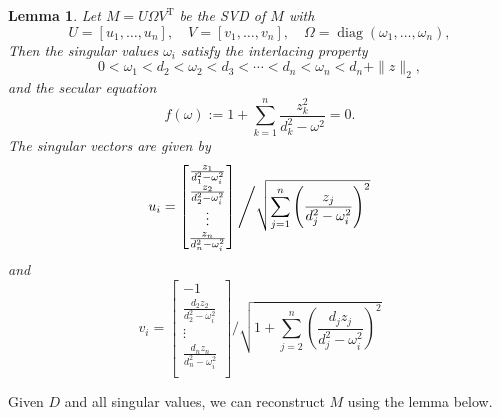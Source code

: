 \documentclass[12pt]{article}
\newcommand{\op}{\operatorname}
\newtheorem{lemma}[theorem]{Lemma}
\begin{document}
\begin{lemma} \label{lm:secular}
    Let \(M = U \Omega V^{\op T}\) be the SVD of \(M\) with
    \[
        U = [u_1, \ldots, u_n], \quad V = [v_1, \ldots, v_n], \quad \Omega = \op{diag}(\omega_1, \ldots, \omega_n),
    \]
    Then the singular values \(\omega_i\) satisfy the interlacing property
    \[
        0 < \omega_1 < d_2 < \omega_2 < d_3 < \cdots < d_n < \omega_n < d_n + \|z\|_2,
    \]
    and the secular equation
    \begin{equation} \label{eq:secular}
        f(\omega) := 1 + \sum_{k=1}^{n} \frac{z_k^2}{d_k^2 - \omega^2} = 0.
    \end{equation}
    The singular vectors are given by
    \begin{equation} \label{eq:left_sing}
        u_i = \begin{bmatrix}
            \frac{z_1}{d_1^2 - \omega_i^2} \\
            \frac{z_2}{d_2^2 - \omega_i^2} \\
            \vdots \\
            \frac{z_n}{d_n^2 - \omega_i^2} \\
        \end{bmatrix} \Bigg/ \sqrt{
            \sum_{j=1}^{n} \left( \frac{z_j}{d_j^2 - \omega_i^2} \right)^2
        } \\
    \end{equation}
    and
    \begin{equation} \label{eq:right_sing}
        v_i = \begin{bmatrix}
            -1 \\
            \frac{d_2 z_2}{d_2^2 - \omega_i^2} \\
            \vdots \\
            \frac{d_n z_n}{d_n^2 - \omega_i^2} \\
        \end{bmatrix} \Bigg/ \sqrt{
            1 + \sum_{j=2}^{n} \left( \frac{d_j z_j}{d_j^2 - \omega_i^2} \right)^2
        }
    \end{equation}
\end{lemma}

Given \(D\) and all singular values, we can reconstruct \(M\) using the lemma below.
\end{document}

